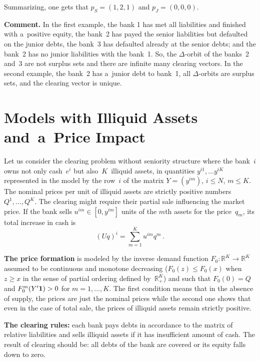 \begin{multicols}{2}
Summarizing, one gets that  $p_S=(1,2,1)$ and $p_J=(0,0,0)$.

\smallskip

\noindent
\textbf{Comment.} In the first example, the bank 1 has met all liabilities and 
finished with a~positive equity,  the bank~2 has payed the senior liabilities 
but defaulted on the junior debts, the bank~3 has defaulted already at the 
senior debts; and the 
bank~2 has no junior liabilities with the bank~1.  So, the $\Delta$-orbit of the 
banks~2 and~3 are not surplus sets and there are infinite many clearing vectors. 
In the second example, the bank~2 has a~junior debt to bank~1, 
all  $\Delta$-orbits are surplus sets, and the clearing vector is unique.


\section{Models with Illiquid Assets and~a~Price Impact}

\noindent
Let us consider the clearing problem without seniority structure where the bank~$i$ 
owns not only cash~$e^i$ but also~$K$~illiquid assets, in quantities 
$y^{i1},\dots y^{iK}$ represented in  the model by the row~$i$ of the matrix 
$Y=(y^{im})$, $i\le N$, $m\le K$. The nominal prices per unit  of illiquid 
assets are strictly positive  numbers $Q^1,\ldots,Q^K$.  The clearing might  
require their partial   sale  influencing   the market price. If the bank sells  
$u^{im}\in [0,y^{im}]$ units of the $m$th assets for the price~$q_m$, its 
total increase in cash is
$$
(Uq)^i=\sum\limits_{m=1}^K u^{im}q^m\,.
$$

\textbf{The price formation}  is modeled by the inverse demand function 
$F_0:\mathbb{R}^K\to \mathbb{R}^K$ assumed to be continuous and monotone 
decreasing ($F_0(z)\le F_0(x)$ when $z\ge x$ in the sense of partial ordering 
defined by~$\mathbb{R}^K_+$) and 
such that $F_0(0)=Q$ and $F^m_0(Y'{\bf 1})>0$ for $m=1,\ldots , K$.  The first 
condition means that in the absence
of supply, the prices are just the nominal prices while  the second one shows 
that even in the case of total sale, the prices of illiquid assets remain strictly 
positive.


\textbf{The clearing rules:} each bank pays  debts in accordance to the matrix of 
relative liabilities
and sells illiquid assets if it has insufficient amount of cash. The result of 
clearing should be: all
debts of the bank are covered or its equity falls down  to zero.




\end{multicols}
